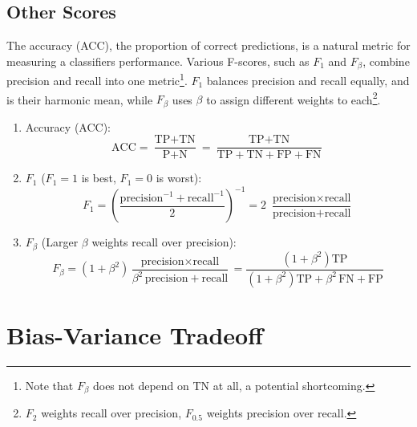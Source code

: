 \subsection{Other Scores}
\label{ml:general:eval:other_scores}

The accuracy (ACC), the proportion of correct predictions, is a natural metric for measuring a classifiers performance.
Various F-scores, such as $F_{1}$ and $F_{\beta}$, combine precision and recall into one metric\footnote{Note that $F_{\beta}$ does not depend on TN at all, a potential shortcoming.}.
$F_{1}$ balances precision and recall equally, and is their harmonic mean,
while $F_{\beta}$ uses $\beta$ to assign different weights to each\footnote{$F_{2}$ weights recall over precision, $F_{0.5}$ weights precision over recall.}.

\begin{enumerate}[noitemsep]
\item Accuracy (ACC):
\begin{equation} \label{eq:ACC}
\text{ACC} = \frac{\text{TP}+\text{TN}}{\text{P}+\text{N}} = \frac{\text{TP}+\text{TN}}{\text{TP}+\text{TN}+\text{FP}+\text{FN}}
\end{equation}

\item $F_{1}$ ($F_{1}=1$ is best, $F_{1}=0$ is worst):
\begin{equation} \label{eq:F1}
F_{1} = \left(\frac{\text{precision}^{-1}+\text{recall}^{-1}}{2}\right)^{-1} = 2\,\,\frac{\text{precision} \times \text{recall}}{\text{precision} + \text{recall}}
\end{equation}

\item $F_{\beta}$ (Larger $\beta$ weights recall over precision):
\begin{equation} \label{eq:Fbeta}
F_{\beta} = \left(1+\beta^{2}\right) \frac{\text{precision} \times \text{recall}}{\beta^{2}\,\text{precision} + \text{recall}} =
\frac{\left(1+\beta^{2}\right) \text{TP}}{\left(1+\beta^{2}\right) \text{TP} + \beta^{2}\,\text{FN} + \text{FP}}
\end{equation}
\end{enumerate}

\clearpage%
\section{Bias-Variance Tradeoff}
\label{ml:general:bias_variance_tradeoff}

